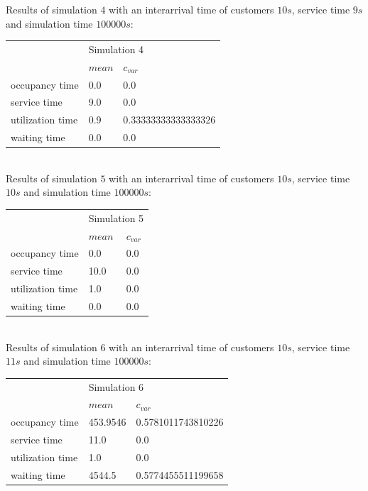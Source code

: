 \newpage
\noindent Results of simulation $4$ with an interarrival time of customers $10s$, service time $9s$ and simulation time $100000s$:
\begin{table}[h]
\centering
\begin{tabular}{|l|l|l|}
\hline
\multirow{2}{*}{} & \multicolumn{2}{l|}{Simulation 4} \\ \cline{2-3} 
                  & $mean$        & $c_{var}$      \\ \hline
occupancy time      & 0.0           & 0.0            \\ \hline
service time      & 9.0           & 0.0            \\ \hline
utilization time  & 0.9           & 0.33333333333333326             \\ \hline
waiting time & 0.0         & 0.0             \\ \hline
\end{tabular}
\end{table}\\
Results of simulation $5$ with an interarrival time of customers $10s$, service time $10s$ and simulation time $100000s$:
\begin{table}[h]
\centering
\begin{tabular}{|l|l|l|}
\hline
\multirow{2}{*}{} & \multicolumn{2}{l|}{Simulation 5} \\ \cline{2-3} 
                  & $mean$        & $c_{var}$      \\ \hline
occupancy time      & 0.0           & 0.0            \\ \hline
service time      & 10.0           & 0.0            \\ \hline
utilization time  & 1.0           & 0.0             \\ \hline
waiting time & 0.0         & 0.0             \\ \hline
\end{tabular}
\end{table}\\
Results of simulation $6$ with an interarrival time of customers $10s$, service time $11s$ and simulation time $100000s$:
\begin{table}[h]
\centering
\begin{tabular}{|l|l|l|}
\hline
\multirow{2}{*}{} & \multicolumn{2}{l|}{Simulation 6} \\ \cline{2-3} 
                  & $mean$        & $c_{var}$      \\ \hline
occupancy time      & 453.9546           & 0.5781011743810226            \\ \hline
service time      & 11.0           & 0.0            \\ \hline
utilization time  & 1.0           & 0.0             \\ \hline
waiting time & 4544.5         & 0.5774455511199658             \\ \hline
\end{tabular}
\end{table}
\newpage
